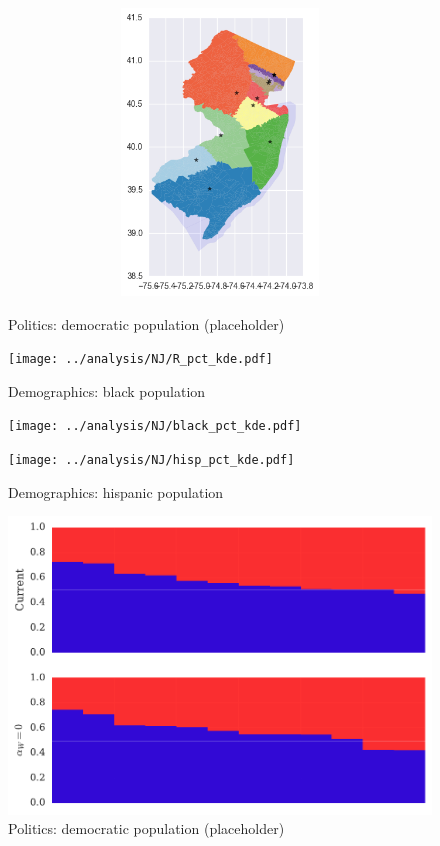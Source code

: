 \begin{figure}[htb!]
\includegraphics[width=5in,height=3in,keepaspectratio]{../maps/NJ/static/0_25_after.png}
\end{figure}

\clearpage
\newpage

\begin{figure}[htb!] \centering
\caption{ Politics: democratic population (placeholder)}
\texttt{[image: ../analysis/NJ/R\_pct\_kde.pdf]}
\caption{ Demographics: black population }
\texttt{[image: ../analysis/NJ/black\_pct\_kde.pdf]}
\caption{ Demographics: hispanic population }
\texttt{[image: ../analysis/NJ/hisp\_pct\_kde.pdf]}
\end{figure}

\clearpage
\newpage

\begin{figure}[htb!] \centering
\caption{ Politics: democratic population (placeholder)}
\includegraphics[width=6in]{../analysis/NJ/barplot.pdf}
\end{figure}

